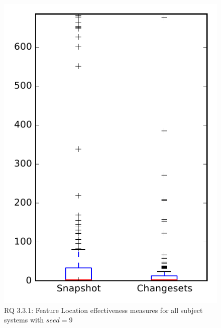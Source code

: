 
\begin{figure}
\centering
\includegraphics[height=0.4\textheight]{figures/flt_seed/rq1_overview_9}
\caption{RQ 3.3.1: Feature Location effectiveness measures for all subject systems with $seed=9$}
\label{fig:flt_seed:rq1:overview}
\end{figure}
